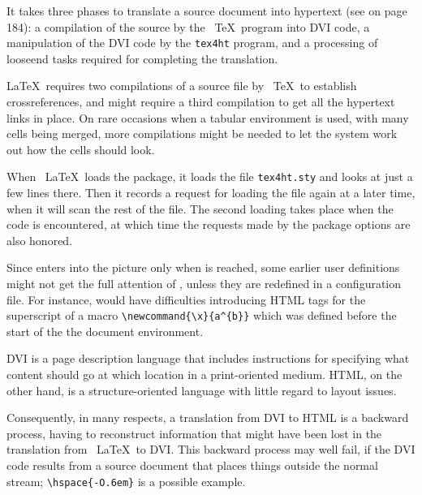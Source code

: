 

It takes three phases to translate a source document into hypertext (see
 on page 184): a compilation of the source by the \ \TeX\
program into DVI code, a manipulation of the DVI code by the
\verb|tex4ht| program, and a processing of looseend tasks required for
completing the translation. 


\LaTeX\ requires two compilations of a source file by \ \TeX\ to
establish crossreferences, and \texht might require a third compilation
to get all the hypertext links in place. On rare occasions when a
tabular environment is used, with many cells being merged, more
compilations might be needed to let the system work out how the cells
should look. 

When \ \LaTeX\  loads the \texht package, it loads the file \verb|tex4ht.sty| and looks 
at just a few lines there. Then it records a request for loading the file again at a later 
time, when it will scan the rest of the file. The second loading takes place when the 
\verb|| code is encountered, at which time the requests made by the 
package options are also honored. 

Since \texht enters into the picture only when \verb||
is reached, some earlier user definitions might not get the full
attention of \texht, unless they are redefined in a configuration file.
For instance, \texht would have difficulties introducing HTML tags for
the superscript of a macro \verb|\newcommand{\x}{a^{b}}| which was
defined before the start of the the document environment. 


DVI is a page description language that includes instructions for
specifying what content should go at which location in a print-oriented
medium. HTML, on the other hand, is a structure-oriented language with
little regard to layout issues. 
 

Consequently, in many respects, a translation from DVI to HTML is a
backward process, having to reconstruct information that might have been
lost in the translation from \ \LaTeX\  to DVI. This backward process
may well fail, if the DVI code results from a source document that
places things outside the normal stream; \verb|\hspace{-O.6em}| is a
possible example. 

